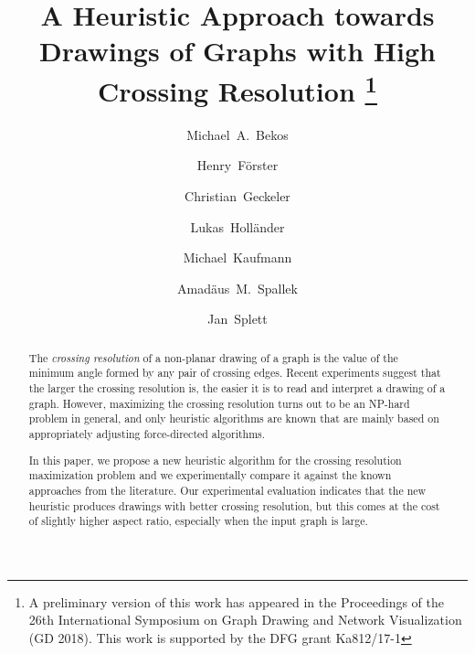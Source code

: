 \documentclass{comjnl}
\begin{document}
\author{Michael~A.~Bekos} 
\author{Henry~F\"orster}
\author{Christian~Geckeler} 
\author{Lukas~Holl\"ander} 
\author{Michael~Kaufmann}
\author{Amad\"aus~M.~Spallek} 
\author{Jan~Splett}

\title[Drawings of Graphs with High Crossing Resolution]{A Heuristic Approach towards Drawings of Graphs with High Crossing Resolution%
\thanks{A preliminary version of this work has appeared in the Proceedings of the 26th International Symposium on Graph Drawing and Network Visualization (GD 2018).
This work is supported by the DFG grant Ka812/17-1}}






\volumenumber{--} 
\issuenumber{--} 

\begin{abstract}
The \emph{crossing resolution} of a non-planar drawing of a graph is the value of the minimum angle formed by any pair of crossing edges. Recent experiments suggest that the larger the crossing resolution is, the easier it is to read and interpret a drawing of a graph. However, maximizing the crossing resolution turns out to be an NP-hard problem in general, and only heuristic algorithms are known that are mainly based on appropriately adjusting force-directed algorithms.

In this paper, we propose a new heuristic algorithm for the crossing resolution maximization problem and we experimentally compare it against the known approaches from the literature. Our experimental evaluation indicates that the new heuristic produces drawings with better crossing resolution, but this comes at the cost of slightly higher aspect ratio, especially when the input graph is large. 
\end{abstract}

\maketitle
\end{document}
